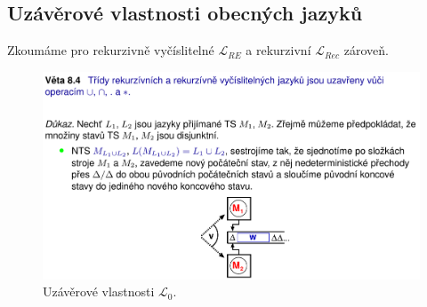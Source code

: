 \subsection{Uzávěrové vlastnosti obecných jazyků}

\begin{compactitem}
    \item Zkoumáme pro rekurzivně vyčíslitelné $\mathcal{L}_{RE}$ a rekurzivní $\mathcal{L}_{Rec}$ zároveň.
\end{compactitem}



\begin{figure}[H]
    \centering
    \includegraphics[width=1\linewidth]{uzaverove_vlasnosti_L0_01.pdf}
    \caption{Uzávěrové vlastnosti $\mathcal{L}_0$.}
\end{figure}

